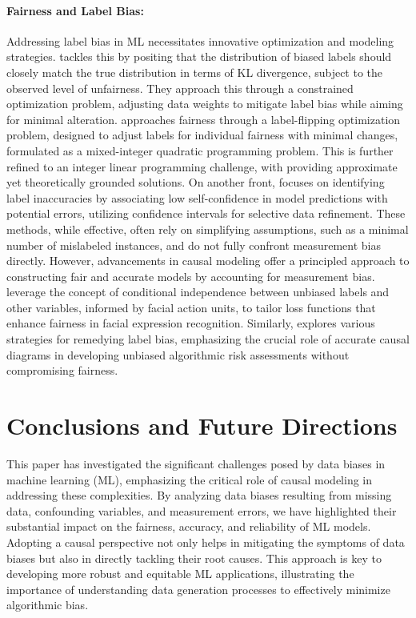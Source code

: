 \documentclass[11pt]{article}
\begin{document}
\vspace{-.5cm}
\paragraph{Fairness and Label Bias:} Addressing label bias in ML necessitates innovative optimization and modeling strategies. \cite{jiang2020identifying} tackles this by positing that the distribution of biased labels should closely match the true distribution in terms of KL divergence, subject to the observed level of unfairness. They approach this through a constrained optimization problem, adjusting data weights to mitigate label bias while aiming for minimal alteration. \cite{zhang2023iflipper} approaches fairness through a label-flipping optimization problem, designed to adjust labels for individual fairness with minimal changes, formulated as a mixed-integer quadratic programming problem. This is further refined to an integer linear programming challenge, with \cite{zhang2023iflipper} providing approximate yet theoretically grounded solutions. On another front, \cite{zhang2023mitigating} focuses on identifying label inaccuracies by associating low self-confidence in model predictions with potential errors, utilizing confidence intervals for selective data refinement.  These methods, while effective, often rely on simplifying assumptions, such as a minimal number of mislabeled instances, and do not fully confront measurement bias directly. However, advancements in causal modeling offer a principled approach to constructing fair and accurate models by accounting for measurement bias. \cite{chen2021understanding} leverage the concept of conditional independence between unbiased labels and other variables, informed by facial action units, to tailor loss functions that enhance fairness in facial expression recognition. Similarly, \cite{dai2020label} explores various strategies for remedying label bias, emphasizing the crucial role of accurate causal diagrams in developing unbiased algorithmic risk assessments without compromising fairness.

\vspace{-.5cm}
\section{Conclusions and Future Directions}
\vspace{-.3cm}

This paper has investigated the significant challenges posed by data biases in machine learning (ML), emphasizing the critical role of causal modeling in addressing these complexities. By analyzing data biases resulting from missing data, confounding variables, and measurement errors, we have highlighted their substantial impact on the fairness, accuracy, and reliability of ML models. Adopting a causal perspective not only helps in mitigating the symptoms of data biases but also in directly tackling their root causes. This approach is key to developing more robust and equitable ML applications, illustrating the importance of understanding data generation processes to effectively minimize algorithmic bias.
\end{document}

